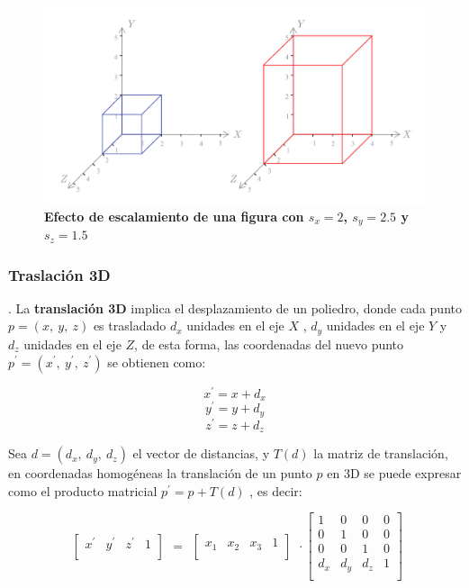 \begin{center}
\begin{figure}[h]
\includegraphics[width=12cm]{Img/GEO/geo-escala0.jpg}
\centering
\caption{\textbf{\footnotesize{Efecto de escalamiento de una figura con $s_x=2$, $s_y=2.5$ y $s_z=1.5$}}}
\end{figure}
\end{center}

\clearpage
\subsubsection{Traslación 3D}
 \citep{Matias2007}. La \textbf{translación 3D} implica el desplazamiento de un poliedro, donde cada punto $p = (x,\ y,\ z)$ es trasladado $d_x$ unidades en el eje $X$ , $d_y$ unidades en el eje $Y$ y $d_z$ unidades en el eje $Z$, de esta forma, las coordenadas del nuevo punto
$p^{\prime} = ({x}^{\prime}, \ {y}^{\prime}, \ {z}^{\prime})$ se obtienen como:

$${x}^{\prime} = x + d_x$$
$${y}^{\prime} = y + d_y$$
$${z}^{\prime} = z + d_z$$

Sea $d = (d_{x},\ d_{y},\ d_{z})$ el vector de distancias, y $T(d)$ la matriz de translación, en
coordenadas homogéneas la translación de un punto $p$ en 3D se puede expresar como el producto matricial $p^{\prime} = p + T(d)$ , es decir:

\begin{equation}
\begin{array}{rccl}
\left[
\begin{array}{rccl}
{x}^{\prime} & {y}^{\prime} & {z}^{\prime} & 1\\
\end{array}
\right]
\end{array}
=
\begin{array}{rccl}
\left[
\begin{array}{rccl}
x_{1} & x_{2} & x_{3} & 1\\
\end{array}
\right]
\end{array} 
\cdot
\left[
\begin{array}{rccl}
1 & 0 & 0 & 0\\
0 & 1 & 0 & 0\\
0 & 0 & 1 & 0\\
d_{x} & d_{y} & d_{z} & 1\\
\end{array}
\right]
\end{equation}


